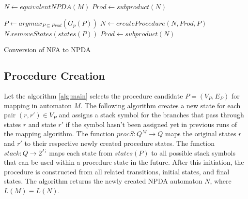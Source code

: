         \begin{algorithm}
            \footnotesize
            \DontPrintSemicolon

            $N \leftarrow \textit{equivalentNPDA}(M)$
            $Prod \leftarrow \textit{subproduct}(N)$\;

            {
                $P \leftarrow argmax_{P \subseteq Prod}(G_p(P))$\;
                $N \leftarrow \textit{createProcedure}(N, Prod, P)$\;
                $N.\textit{removeStates}(\textit{states}(P))$\;
                $Prod \leftarrow \textit{subproduct}(N)$\;
            }


            \normalsize
            \caption{Conversion of NFA to NPDA}
            \label{alg:main}
        \end{algorithm}

    \subsection{Procedure Creation}
        Let the algorithm \ref{alg:main} selects the procedure candidate $P = (V_P, E_P)$ for mapping in automaton $M$. The following algorithm creates a new state for each pair $(r, r') \in V_P$ and assigns a stack symbol for the branches that pass through states $r$ and state $r'$ if the symbol hasn't been assigned yet in previous runs of the mapping algorithm. The function $procS: Q^M \rightarrow Q$ maps the original states $r$ and $r'$ to their respective newly created procedure states. The function $stack: Q \rightarrow 2^{\Gamma_\epsilon}$ maps each state from $states(P)$ to all possible stack symbols that can be used within a procedure state in the future. After this initiation, the procedure is constructed from all related transitions, initial states, and final states. The algorithm returns the newly created NPDA automaton $N$, where $L(M) \equiv L(N)$.

